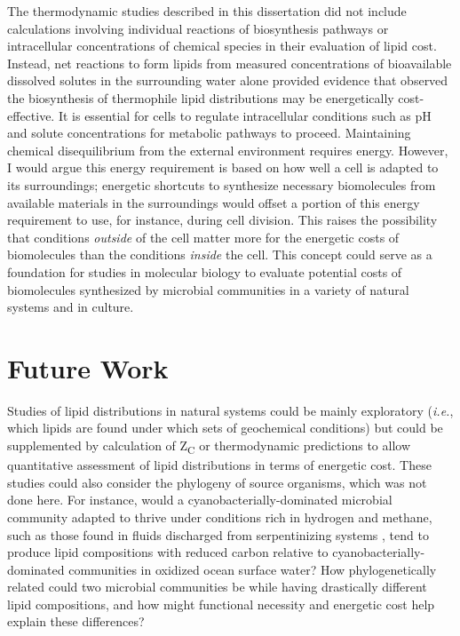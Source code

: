 The thermodynamic studies described in this dissertation did not include calculations involving individual reactions of biosynthesis pathways or intracellular concentrations of chemical species in their evaluation of lipid cost. Instead, net reactions to form lipids from measured concentrations of bioavailable dissolved solutes in the surrounding water alone provided evidence that observed the biosynthesis of thermophile lipid distributions may be energetically cost-effective. It is essential for cells to regulate intracellular conditions such as pH and solute concentrations for metabolic pathways to proceed. Maintaining chemical disequilibrium from the external environment requires energy. However, I would argue this energy requirement is based on how well a cell is adapted to its surroundings; energetic shortcuts to synthesize necessary biomolecules from available materials in the surroundings would offset a portion of this energy requirement to use, for instance, during cell division. This raises the possibility that conditions \textit{outside} of the cell matter more for the energetic costs of biomolecules than the conditions \textit{inside} the cell. This concept could serve as a foundation for studies in molecular biology to evaluate potential costs of biomolecules synthesized by microbial communities in a variety of natural systems and in culture.

\section{Future Work}

Studies of lipid distributions in natural systems could be mainly exploratory (\textit{i.e.}, which lipids are found under which sets of geochemical conditions) but could be supplemented by calculation of Z\textsubscript{C} or thermodynamic predictions to allow quantitative assessment of lipid distributions in terms of energetic cost. These studies could also consider the phylogeny of source organisms, which was not done here. For instance, would a cyanobacterially-dominated microbial community adapted to thrive under conditions rich in hydrogen and methane, such as those found in fluids discharged from serpentinizing systems \citep{}, tend to produce lipid compositions with reduced carbon relative to cyanobacterially-dominated communities in oxidized ocean surface water? How phylogenetically related could two microbial communities be while having drastically different lipid compositions, and how might functional necessity and energetic cost help explain these differences?

